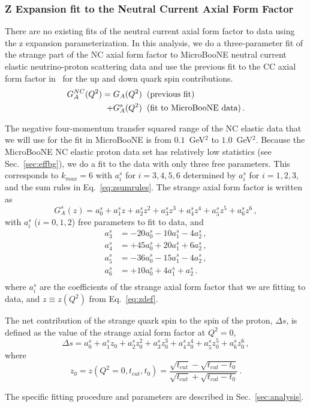   \subsubsection{Z Expansion fit to the Neutral Current Axial Form Factor}

  There are no existing fits of the neutral current axial form factor to data
  using the z expansion parameterization. In this analysis, we do a
  three-parameter fit of the strange part of the NC axial form factor to
  MicroBooNE neutral current elastic neutrino-proton scattering data and use
  the previous fit to the CC axial form factor in~\cite{Meyer:2016oeg} for the
  up and down quark spin contributions.
  \begin{align*}
    G_A^{NC}(Q^2) = G_A(Q^2) \hspace{2mm} &(\textrm{previous fit}) \\
                + G_A^s(Q^2) \hspace{2mm} &(\textrm{fit to MicroBooNE data}) \,.
  \end{align*}

  The negative four-momentum transfer squared range of the NC elastic data that
  we will use for the fit in MicroBooNE is from $0.1$~GeV$^2$ to $1.0$~GeV$^2$.
  Because the MicroBooNE NC elastic proton data set has relatively low
  statistics (see Sec.~\ref{sec:effbg}), we do a fit to the data with only
  three free parameters. This corresponds to $k_{max} = 6$ with $a_i^s$ for
  $i=3,4,5,6$ determined by $a_i^s$ for $i=1,2,3$, and the sum rules in
  Eq.~\ref{eq:zsumrules}. The strange axial form factor is written as
  \begin{equation}
    G_A^s(z) = a_0^s + a_1^s z + a_2^s z^2 
      + a_3^s z^3 + a_4^s z^4 + a_5^s z^5 + a_6^s z^6 \,,
  \end{equation}
  with $a_i^s$ ($i=0,1,2$) free parameters to fit to data, and
  \begin{align*}
    a_3^s &= - 20 a_0^s - 10 a_1^s - 4 a_2^s \,,\\
    a_4^s &= + 45 a_0^s + 20 a_1^s + 6 a_2^s \,, \\
    a_5^s &= - 36 a_0^s - 15 a_1^s - 4 a_2^s \,, \\
    a_6^s &= + 10 a_0^s + 4 a_1^s + a_2^s \,. \\
  \end{align*}
  where $a_i^s$ are the coefficients of the strange axial form factor that we
  are fitting to data, and $z \equiv z(Q^2)$ from Eq.~\ref{eq:zdef}.

  The net contribution of the strange quark spin to the spin of the proton,
  $\Delta s$, is defined as the value of the strange axial form factor at $Q^2
  = 0$,
  \begin{equation}
    \Delta s = a_0^s + a_1^s z_0 + a_2^s z_0^2 
      + a_3^s z_0^3 + a_4^s z_0^4 + a_5^s z_0^5 + a_6^s z_0^6 \,,
  \end{equation}
  where
  \begin{equation*}
    z_0 = z(Q^2 = 0,t_{cut},t_0) = \frac{\sqrt{t_{cut}} - \sqrt{t_{cut} - t_0}}{\sqrt{t_{cut}} + \sqrt{t_{cut} - t_0}} \,.
  \end{equation*}

  The specific fitting procedure and parameters are described in
  Sec.~\ref{sec:analysis}.


